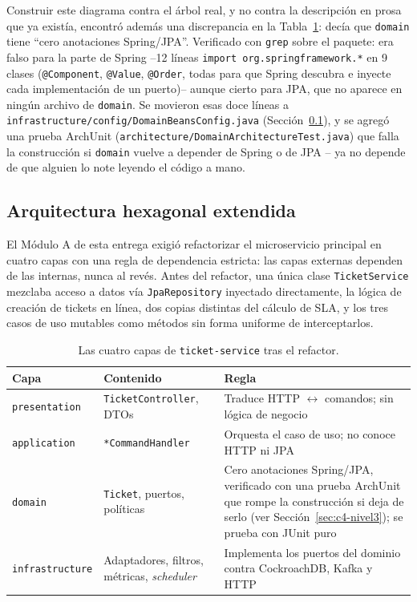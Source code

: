 Construir este diagrama contra el árbol real, y no contra la descripción en prosa que ya existía,
encontró además una discrepancia en la Tabla~\ref{tab:capas-e4}: decía que \texttt{domain} tiene
``cero anotaciones Spring/JPA''. Verificado con \texttt{grep} sobre el paquete: era falso para la
parte de Spring --12 líneas \texttt{import org.springframework.*} en 9 clases
(\texttt{@Component}, \texttt{@Value}, \texttt{@Order}, todas para que Spring descubra e inyecte
cada implementación de un puerto)-- aunque cierto para JPA, que no aparece en ningún archivo de
\texttt{domain}. Se movieron esas doce líneas a
\texttt{infrastructure/config/DomainBeansConfig.java} (Sección~\ref{sec:hexagonal-e4}), y se
agregó una prueba ArchUnit (\texttt{architecture/DomainArchitectureTest.java}) que falla la
construcción si \texttt{domain} vuelve a depender de Spring o de JPA -- ya no depende de que
alguien lo note leyendo el código a mano.

\subsection{Arquitectura hexagonal extendida}
\label{sec:hexagonal-e4}

El Módulo A de esta entrega exigió refactorizar el microservicio principal en cuatro capas con
una regla de dependencia estricta: las capas externas dependen de las internas, nunca al revés.
Antes del refactor, una única clase \texttt{TicketService} mezclaba acceso a datos vía
\texttt{JpaRepository} inyectado directamente, la lógica de creación de tickets en línea, dos
copias distintas del cálculo de SLA, y los tres casos de uso mutables como métodos sin forma
uniforme de interceptarlos.

\begin{table}[H]
\centering
\small
\caption{Las cuatro capas de \texttt{ticket-service} tras el refactor.}
\label{tab:capas-e4}
\begin{tabular}{@{}p{2.6cm}p{5.8cm}p{5.1cm}@{}}
\toprule
\textbf{Capa} & \textbf{Contenido} & \textbf{Regla} \\
\midrule
\texttt{presentation} & \texttt{TicketController}, DTOs & Traduce HTTP $\leftrightarrow$ comandos; sin lógica de negocio \\
\texttt{application} & \texttt{*CommandHandler} & Orquesta el caso de uso; no conoce HTTP ni JPA \\
\texttt{domain} & \texttt{Ticket}, puertos, políticas & Cero anotaciones Spring/JPA, verificado
  con una prueba ArchUnit que rompe la construcción si deja de serlo (ver
  Sección~\ref{sec:c4-nivel3}); se prueba con JUnit puro \\
\texttt{infrastructure} & Adaptadores, filtros, métricas, \emph{scheduler} & Implementa los puertos del dominio contra CockroachDB, Kafka y HTTP \\
\bottomrule
\end{tabular}
\end{table}

